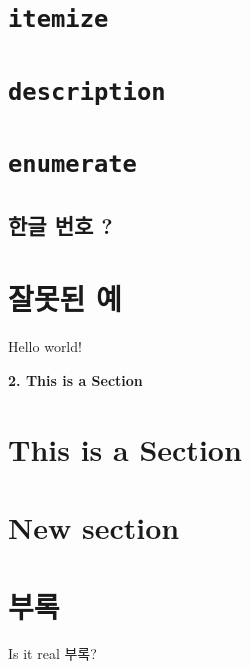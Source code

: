 \documentclass[11pt]{article}
\begin{document}
\tableofcontents

\newpage
\section{\texttt{itemize}}
\section{\texttt{description}}
\section{\texttt{enumerate}}
\subsection{한글 번호 ?}
\section{잘못된 예}
Hello world!

\begin{center}
\textbf{\Large 2. This is a Section}
\end{center}

\section{This is a Section}

\section*{New section}

\section*{부록}
Is it real 부록?
\end{document}
